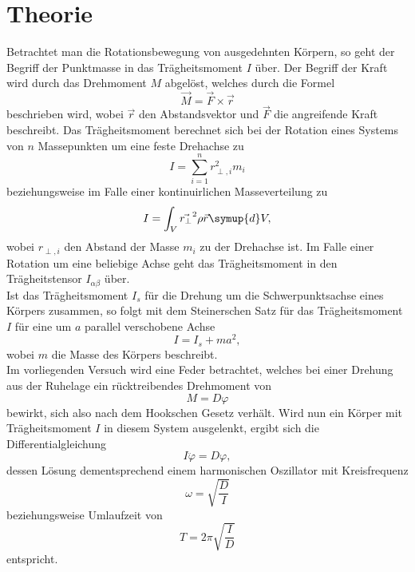 \section{Theorie}
\label{sec:Theorie}
Betrachtet man die Rotationsbewegung von ausgedehnten Körpern, so geht der Begriff der Punktmasse in das Trägheitsmoment $I$ über.
Der Begriff der Kraft wird durch das Drehmoment $M$ abgelöst, welches durch die Formel
\begin{equation}
  \vec{M} = \vec{F} \times \vec{r}
\end{equation}
beschrieben wird, wobei $\vec{r}$ den Abstandsvektor und $\vec{F}$ die angreifende Kraft beschreibt.
Das Trägheitsmoment berechnet sich bei der Rotation eines Systems von $n$ Massepunkten um eine feste Drehachse zu
\begin{equation}
  I = \sum_{i=1}^n r_{\perp, i}^2 m_i
  \label{eqn:tm1}
\end{equation}
beziehungsweise im Falle einer kontinuirlichen Masseverteilung zu
\begin{equation}
  I = \int_V^{} \vec{r_{\perp}}^2 \rho{\vec{r}} \symup{d}V,
  \label{eqn:tm2}
\end{equation}
wobei $r_{\perp, i}$ den Abstand der Masse $m_i$ zu der Drehachse ist.
Im Falle einer Rotation um eine beliebige Achse geht das Trägheitsmoment in den Trägheitstensor $I_{\alpha \beta}$ über.\\
Ist das Trägheitsmoment $I_s$ für die Drehung um die Schwerpunktsachse eines Körpers zusammen, so folgt mit dem Steinerschen Satz für das Trägheitsmoment $I$ für eine um $a$ parallel verschobene Achse
\begin{equation}
  I = I_s + m a^2,
  \label{eqn:steiner}
\end{equation}
wobei $m$ die Masse des Körpers beschreibt.\\
Im vorliegenden Versuch wird eine Feder betrachtet, welches bei einer Drehung aus der Ruhelage ein rücktreibendes Drehmoment von
\begin{equation}
  M = D \varphi
\end{equation}
bewirkt, sich also nach dem Hookschen Gesetz verhält.
Wird nun ein Körper mit Trägheitsmoment $I$ in diesem System ausgelenkt, ergibt sich die Differentialgleichung
\begin{equation}
  I \ddot{\varphi} = D \varphi,
\end{equation}
dessen Lösung dementsprechend einem harmonischen Oszillator mit Kreisfrequenz
\begin{equation}
  \omega = \sqrt{\frac{D}{I}}
\end{equation}
beziehungsweise Umlaufzeit von
\begin{equation}
  T = 2 \pi \sqrt{\frac{I}{D}}
\end{equation}
entspricht.

